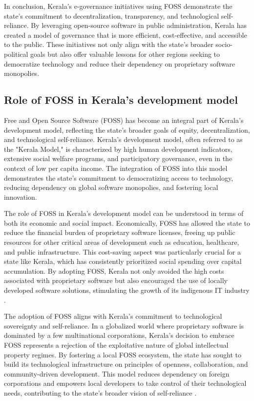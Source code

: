 \begin{refsection}
In conclusion, Kerala’s e-governance initiatives using FOSS demonstrate the state’s commitment to decentralization, transparency, and technological self-reliance. By leveraging open-source software in public administration, Kerala has created a model of governance that is more efficient, cost-effective, and accessible to the public. These initiatives not only align with the state’s broader socio-political goals but also offer valuable lessons for other regions seeking to democratize technology and reduce their dependency on proprietary software monopolies.

\subsection{Role of FOSS in Kerala's development model}

Free and Open Source Software (FOSS) has become an integral part of Kerala’s development model, reflecting the state’s broader goals of equity, decentralization, and technological self-reliance. Kerala's development model, often referred to as the "Kerala Model," is characterized by high human development indicators, extensive social welfare programs, and participatory governance, even in the context of low per capita income. The integration of FOSS into this model demonstrates the state's commitment to democratizing access to technology, reducing dependency on global software monopolies, and fostering local innovation.

The role of FOSS in Kerala’s development model can be understood in terms of both its economic and social impact. Economically, FOSS has allowed the state to reduce the financial burden of proprietary software licenses, freeing up public resources for other critical areas of development such as education, healthcare, and public infrastructure. This cost-saving aspect was particularly crucial for a state like Kerala, which has consistently prioritized social spending over capital accumulation. By adopting FOSS, Kerala not only avoided the high costs associated with proprietary software but also encouraged the use of locally developed software solutions, stimulating the growth of its indigenous IT industry \cite[pp.~15-18]{prabhakar2010itschool}.

The adoption of FOSS aligns with Kerala’s commitment to technological sovereignty and self-reliance. In a globalized world where proprietary software is dominated by a few multinational corporations, Kerala’s decision to embrace FOSS represents a rejection of the exploitative nature of global intellectual property regimes. By fostering a local FOSS ecosystem, the state has sought to build its technological infrastructure on principles of openness, collaboration, and community-driven development. This model reduces dependency on foreign corporations and empowers local developers to take control of their technological needs, contributing to the state’s broader vision of self-reliance \cite[pp.~22-23]{kerala2007itpolicy}.


\end{refsection}
